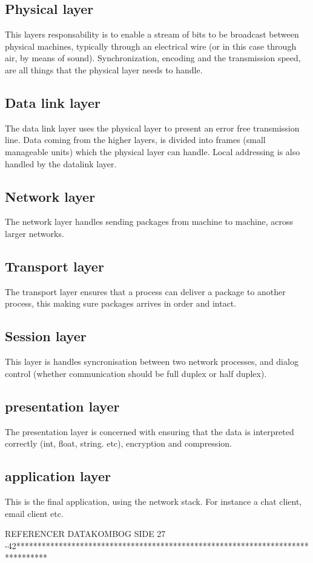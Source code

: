 \subsection{Physical layer}
This layers responsability is to enable a stream of bits to be broadcast between physical machines, typically through an electrical wire (or in this case through air, by means of sound). Synchronization, encoding and the transmission speed, are all things that the physical layer needs to handle.

\subsection{Data link layer}
The data link layer uses the physical layer to present an error free transmission line. Data coming from the higher layers, is divided into frames (small manageable units) which the physical layer can handle. Local addressing is also handled by the datalink layer.

\subsection{Network layer}
The network layer handles sending packages from machine to machine, across larger networks.

\subsection{Transport layer}
The transport layer ensures that a process can deliver a package to another process, this making sure packages arrives in order and intact.

\subsection{Session layer}
This layer is handles syncronisation between two network processes, and dialog control (whether communication should be full duplex or half duplex).

\subsection{presentation layer}
The presentation layer is concerned with ensuring that the data is interpreted correctly (int, float, string. etc), encryption and compression.

\subsection{application layer}
This is the final application, using the network stack. For instance a chat client, email client etc.





REFERENCER DATAKOMBOG SIDE 27 -42*******************************************************************************